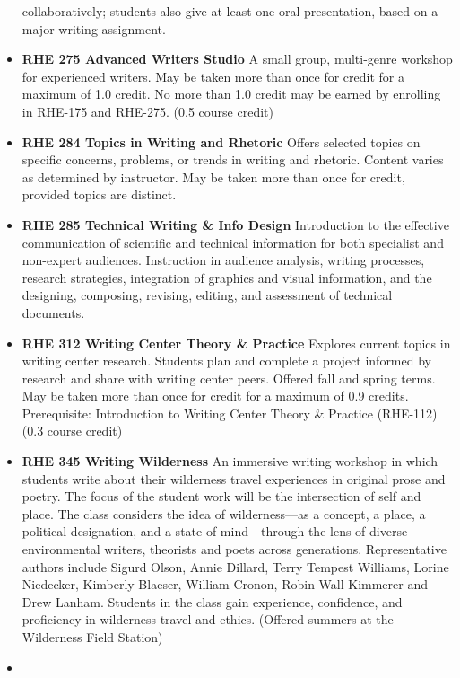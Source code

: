 \documentclass[
  letterpaper,
]{scrbook}
\begin{document}
\begin{itemize}
  collaboratively; students also give at least one oral presentation,
  based on a major writing assignment.\\
\item
  \textbf{RHE 275 Advanced Writers Studio} A small group, multi-genre
  workshop for experienced writers. May be taken more than once for
  credit for a maximum of 1.0 credit. No more than 1.0 credit may be
  earned by enrolling in RHE-175 and RHE-275. (0.5 course credit)
\item
  \textbf{RHE 284 Topics in Writing and Rhetoric} Offers selected topics
  on specific concerns, problems, or trends in writing and rhetoric.
  Content varies as determined by instructor. May be taken more than
  once for credit, provided topics are distinct.\\
\item
  \textbf{RHE 285 Technical Writing \& Info Design} Introduction to the
  effective communication of scientific and technical information for
  both specialist and non-expert audiences. Instruction in audience
  analysis, writing processes, research strategies, integration of
  graphics and visual information, and the designing, composing,
  revising, editing, and assessment of technical documents.
\item
  \textbf{RHE 312 Writing Center Theory \& Practice} Explores current
  topics in writing center research. Students plan and complete a
  project informed by research and share with writing center peers.
  Offered fall and spring terms. May be taken more than once for credit
  for a maximum of 0.9 credits. Prerequisite: Introduction to Writing
  Center Theory \& Practice (RHE-112) (0.3 course credit)\\
\item
  \textbf{RHE 345 Writing Wilderness} An immersive writing workshop in
  which students write about their wilderness travel experiences in
  original prose and poetry. The focus of the student work will be the
  intersection of self and place. The class considers the idea of
  wilderness---as a concept, a place, a political designation, and a
  state of mind---through the lens of diverse environmental writers,
  theorists and poets across generations. Representative authors include
  Sigurd Olson, Annie Dillard, Terry Tempest Williams, Lorine Niedecker,
  Kimberly Blaeser, William Cronon, Robin Wall Kimmerer and Drew Lanham.
  Students in the class gain experience, confidence, and proficiency in
  wilderness travel and ethics. (Offered summers at the Wilderness Field
  Station)
\item

\end{itemize}
\end{document}
